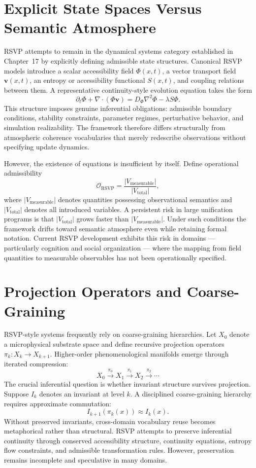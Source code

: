 \documentclass[12pt, openright, twoside]{book}
\begin{document}
\section{Explicit State Spaces Versus Semantic Atmosphere}

RSVP attempts to remain in the dynamical systems category established in
Chapter~17 by explicitly defining admissible state structures. Canonical
RSVP models introduce a scalar accessibility field $\Phi(x,t)$, a vector
transport field $\mathbf{v}(x,t)$, an entropy or accessibility functional
$S(x,t)$, and coupling relations between them. A representative
continuity-style evolution equation takes the form
\[
\partial_t \Phi + \nabla \cdot (\Phi \mathbf{v})
= D_\Phi \nabla^2 \Phi - \lambda S \Phi.
\]
This structure imposes genuine inferential obligations: admissible boundary
conditions, stability constraints, parameter regimes, perturbative behavior,
and simulation realizability. The framework therefore differs structurally
from atmospheric coherence vocabularies that merely redescribe observations
without specifying update dynamics.

However, the existence of equations is insufficient by itself. Define
operational admissibility
\[
\mathcal{O}_{\mathrm{RSVP}}
= \frac{|V_{\mathrm{measurable}}|}{|V_{\mathrm{total}}|},
\]
where $|V_{\mathrm{measurable}}|$ denotes quantities possessing
observational semantics and $|V_{\mathrm{total}}|$ denotes all introduced
variables. A persistent risk in large unification programs is that
$|V_{\mathrm{total}}|$ grows faster than $|V_{\mathrm{measurable}}|$.
Under such conditions the framework drifts toward semantic atmosphere even
while retaining formal notation. Current RSVP development exhibits this
risk in domains --- particularly cognition and social organization ---
where the mapping from field quantities to measurable observables has not
been operationally specified.

\section{Projection Operators and Coarse-Graining}

RSVP-style systems frequently rely on coarse-graining hierarchies. Let
$X_0$ denote a microphysical substrate space and define recursive
projection operators $\pi_k : X_k \to X_{k+1}$. Higher-order
phenomenological manifolds emerge through iterated compression:
\[
X_0
\xrightarrow{\pi_0} X_1
\xrightarrow{\pi_1} X_2
\xrightarrow{\pi_2} \cdots
\]
The crucial inferential question is whether invariant structure survives
projection. Suppose $I_k$ denotes an invariant at level $k$. A disciplined
coarse-graining hierarchy requires approximate commutation:
\[
I_{k+1}(\pi_k(x)) \approx I_k(x).
\]
Without preserved invariants, cross-domain vocabulary reuse becomes
metaphorical rather than structural. RSVP attempts to preserve inferential
continuity through conserved accessibility structure, continuity equations,
entropy flow constraints, and admissible transformation rules. However,
preservation remains incomplete and speculative in many domains.
\end{document}
